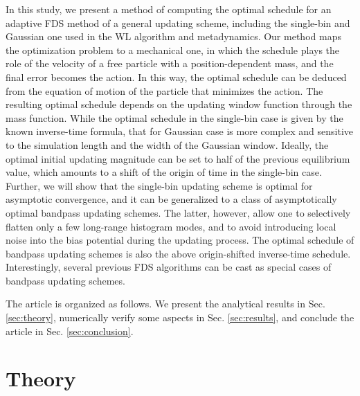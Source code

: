 \documentclass[reprint, superscriptaddress, floatfix]{revtex4-1}
\begin{document}
In this study,
we present a method of computing
the optimal schedule
for an adaptive FDS method
of a general updating scheme,
including the single-bin and Gaussian one
used in the WL algorithm and metadynamics.
%
Our method maps the optimization problem to a mechanical one,
in which the schedule plays the role of the velocity of
a free particle with a position-dependent mass,
and the final error becomes the action.
%
In this way, the optimal schedule
can be deduced from the equation of motion
of the particle that minimizes the action.
%
The resulting optimal schedule
depends on the updating window function
through the mass function.
%
While the optimal schedule in the single-bin case
is given by the known inverse-time formula,
that for Gaussian case is more complex
and sensitive to the simulation length
and the width of the Gaussian window.
%
Ideally,
the optimal initial updating magnitude
can be set to
half of the previous equilibrium value,
which amounts to a shift of the origin of time
in the single-bin case.
%
Further, we will show that
the single-bin updating scheme
is optimal for asymptotic convergence,
and it can be generalized
to a class of asymptotically optimal
bandpass updating schemes.
%
The latter, however,
allow one to selectively flatten only
a few long-range histogram modes,
and to avoid introducing local noise
into the bias potential during the updating process.
%
The optimal schedule of bandpass updating schemes
is also the above origin-shifted inverse-time schedule.
%
Interestingly, several previous FDS algorithms\cite{
  langfeld2012, pellegrini2014,
  neuhaus2006, *neuhaus2007}
can be cast as special cases of bandpass updating schemes.

%



The article is organized as follows.
%
We present the analytical results in Sec. \ref{sec:theory},
numerically verify some aspects
in Sec. \ref{sec:results},
and conclude the article
in Sec. \ref{sec:conclusion}.




\section{\label{sec:theory}
Theory}
\end{document}
